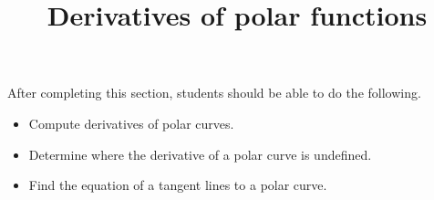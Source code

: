 \documentclass{ximera}
\title{Derivatives of polar functions}
\begin{document}
\begin{abstract}
\end{abstract}

\maketitle

\begin{sectionOutcomes}

After completing this section, students should be able to do the following.

\begin{itemize}
\item Compute derivatives of polar curves.
\item Determine where the derivative of a polar curve is undefined.
\item Find the equation of a tangent lines to a polar curve.
\end{itemize}

\end{sectionOutcomes}
\end{document}

